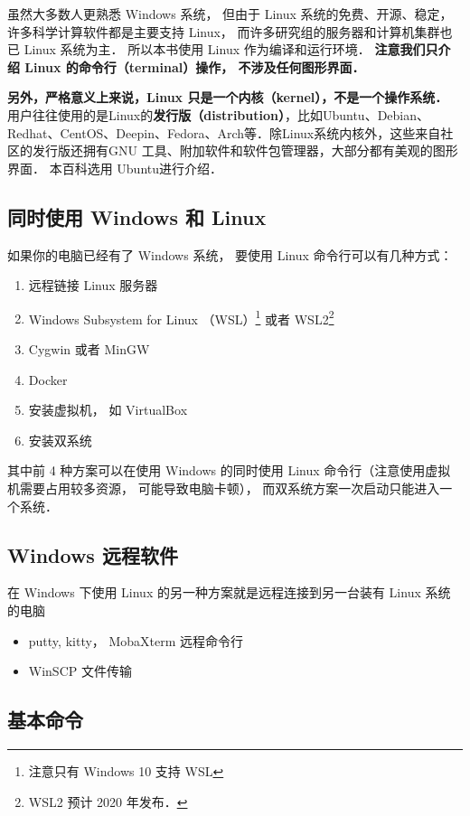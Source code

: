 
\begin{issues}
\issueTODO
\end{issues}

虽然大多数人更熟悉 Windows 系统， 但由于 Linux 系统的免费、开源、稳定， 许多科学计算软件都是主要支持 Linux， 而许多研究组的服务器和计算机集群也已 Linux 系统为主． 所以本书使用 Linux 作为编译和运行环境． \textbf{注意我们只介绍 Linux 的命令行（\textbf{terminal}）操作， 不涉及任何图形界面． }

\textbf{另外，严格意义上来说，Linux 只是一个内核（kernel），不是一个操作系统．} 用户往往使用的是Linux的\textbf{发行版（distribution）}，比如Ubuntu、Debian、Redhat、CentOS、Deepin、Fedora、Arch等．除Linux系统内核外，这些来自社区的发行版还拥有GNU 工具、附加软件和软件包管理器，大部分都有美观的图形界面． 本百科选用 Ubuntu进行介绍．


\subsection{同时使用 Windows 和 Linux}
如果你的电脑已经有了 Windows 系统， 要使用 Linux 命令行可以有几种方式：
\begin{enumerate}
\item 远程链接 Linux 服务器
\item Windows Subsystem for Linux （WSL）\footnote{注意只有 Windows 10 支持 WSL} 或者 WSL2\footnote{WSL2 预计 2020 年发布．}
\item Cygwin 或者 MinGW
\item Docker
\item 安装虚拟机， 如 VirtualBox
\item 安装双系统
\end{enumerate}
其中前 4 种方案可以在使用 Windows 的同时使用 Linux 命令行（注意使用虚拟机需要占用较多资源， 可能导致电脑卡顿）， 而双系统方案一次启动只能进入一个系统．

\subsection{Windows 远程软件}
在 Windows 下使用 Linux 的另一种方案就是远程连接到另一台装有 Linux 系统的电脑
\begin{itemize}
\item putty, kitty， MobaXterm 远程命令行
\item WinSCP 文件传输
\end{itemize}

\subsection{基本命令}

